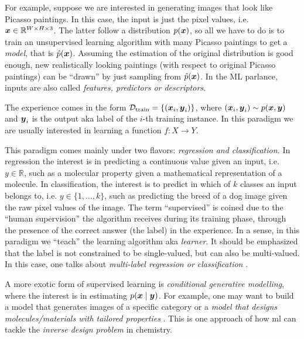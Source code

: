 For example, suppose we are interested in generating images that look like
Picasso paintings. In this case, the input is just the pixel values, i.e.  $\boldsymbol{x}
\in \mathbb{R}^{W \times H \times 3}$. The latter follow a distribution
$p(\boldsymbol{x})$, so all we have to do is to train an unsupervised learning algorithm
with many Picasso paintings to get a \emph{model}, that is $\hat{p}(\boldsymbol{x})$.
Assuming the estimation of the original distribution is good enough, new
realistically looking paintings (with respect to original Picasso paintings) can
be ``drawn'' by just sampling from $\hat{p}(\boldsymbol{x})$. In the ML parlance, inputs
are also called \emph{features, predictors or
descriptors}.

\begin{definition}[name=Supervised learning]
	The experience comes in the form $\mathcal{D}_\text{train} = \{(\boldsymbol{x}_i, \boldsymbol{y}_i)\}$, where
	$(\boldsymbol{x}_i, \boldsymbol{y}_i) \sim p(\boldsymbol{x}, \boldsymbol{y})$ and $\boldsymbol{y}_i$ is the output aka
	label of the $i$-th training instance. In this paradigm we are
	usually interested in learning a function $f \colon X \to Y$.
\end{definition}

This paradigm comes mainly under two flavors: \emph{regression
and classification.} In regression the interest is in
predicting a continuous value given an input, i.e.  $y \in \mathbb{R}$, such as
a molecular property given a mathematical representation of a molecule. In
classification, the interest is to predict in which of $k$ classes an input
belongs to, i.e. $y \in \{1, \ldots, k\}$, such as predicting the breed of a dog
image given the raw pixel values of the image. The term ``supervised'' is coined
due to the ``human supervision'' the algorithm receives during its training
phase, through the presence of the correct answer (the label) in the experience.
In a sense, in this paradigm we ``teach'' the learning algorithm aka
\emph{learner}. It should be emphasized that the label is not constrained to be
single-valued, but can also be multi-valued. In this case, one talks about
\emph{multi-label regression or
classification}
\parencite{Read_2009}.

A more exotic form of supervised learning is \emph{conditional generative
modelling}, where the interest is in
estimating $p(\boldsymbol{x} \mid \boldsymbol{y})$. For example, one may want to build a model that
generates images of a specific category or a \emph{model that designs
molecules/materials with tailored properties} \parencite{Kim2018, Yao2021,
Gebauer2022}. This is one approach of how \gls{ml} can tackle the \emph{inverse
design problem} in chemistry.

